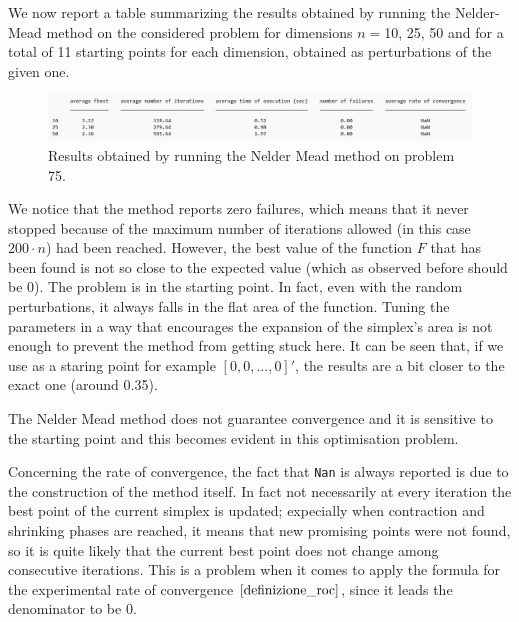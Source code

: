 We now report a table summarizing the results obtained by running the Nelder-Mead method
on the considered problem for dimensions $n=$10, 25, 50 and for a total of 11 starting 
points for each dimension, obtained as perturbations of the given one.

\begin{figure}[H]
    \centering
    \includegraphics[width=1\textwidth]{img/pb75_table_SX.png}
    \caption{Results obtained by running the Nelder Mead method on problem 75.} 
    \label{pb 75 table SX}
\end{figure}

We notice that the method reports zero failures, which means that it never stopped because of the maximum 
number of iterations allowed (in this case $200\cdot n$) had been reached. However, the best value of the 
function $F$ that has been found is not so close to the expected value (which as observed before should be 0).
The problem is in the starting point. In fact, even with the random perturbations, it always falls in the flat area 
of the function. Tuning the parameters in a way that encourages the expansion of the simplex's area is not enough 
to prevent the method from getting stuck here. It can be seen that, if we use as a staring point for example $[0,0,...,0]'$, 
the results are a bit closer to the exact one (around 0.35). 

The Nelder Mead method does not guarantee convergence and it is sensitive to the starting point and this becomes evident 
in this optimisation problem.

Concerning the rate of convergence, the fact that \verb+Nan+ is always reported is due to the construction of the method
itself. In fact not necessarily at every iteration the best point of the current simplex is updated; expecially when contraction
and shrinking phases are reached, it means that new promising points were not found, so it is quite likely that the current best point
does not change among consecutive iterations. This is a problem when it comes to apply the formula for the experimental rate of 
convergence $\eqref{definizione_roc}$, since it leads the denominator to be 0.

\medskip
